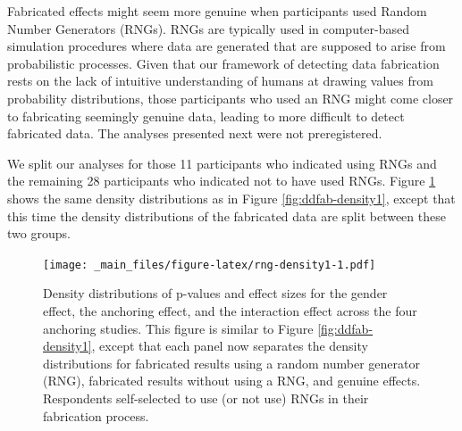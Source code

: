 \documentclass[a5paper]{book}
\begin{document}
Fabricated effects might seem more genuine when participants used Random
Number Generators (RNGs). RNGs are typically used in computer-based
simulation procedures where data are generated that are supposed to
arise from probabilistic processes. Given that our framework of
detecting data fabrication rests on the lack of intuitive understanding
of humans at drawing values from probability distributions, those
participants who used an RNG might come closer to fabricating seemingly
genuine data, leading to more difficult to detect fabricated data. The
analyses presented next were not preregistered.

We split our analyses for those 11 participants who indicated using RNGs
and the remaining 28 participants who indicated not to have used RNGs.
Figure \ref{fig:rng-density1} shows the same density distributions as in
Figure \ref{fig:ddfab-density1}, except that this time the density
distributions of the fabricated data are split between these two groups.

\begin{figure}
\centering
\texttt{[image: \_main\_files/figure-latex/rng-density1-1.pdf]}
\caption{\label{fig:rng-density1}Density distributions of p-values and
effect sizes for the gender effect, the anchoring effect, and the
interaction effect across the four anchoring studies. This figure is
similar to Figure \ref{fig:ddfab-density1}, except that each panel now
separates the density distributions for fabricated results using a
random number generator (RNG), fabricated results without using a RNG,
and genuine effects. Respondents self-selected to use (or not use) RNGs
in their fabrication process.}
\end{figure}
\end{document}
